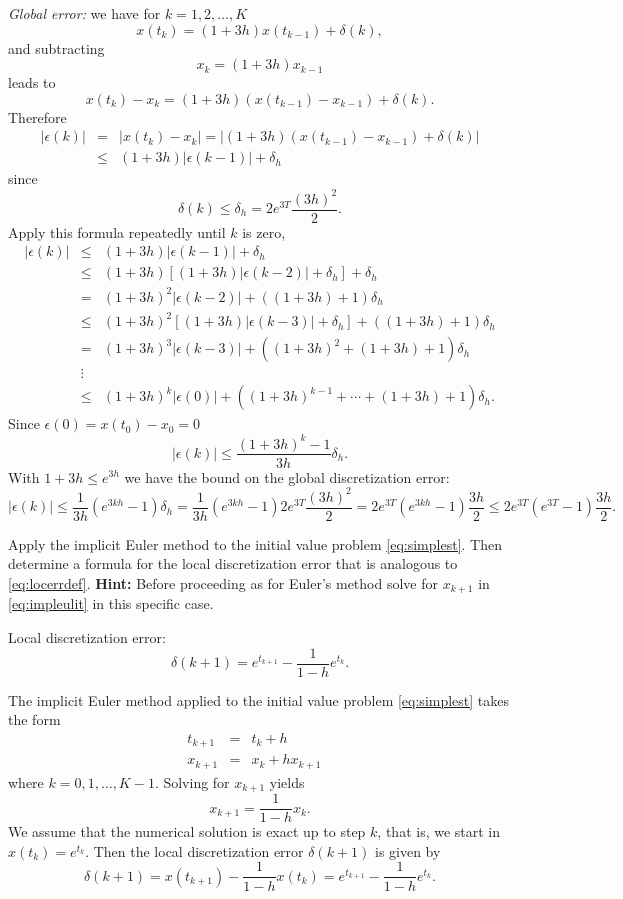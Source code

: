 \documentclass{ximera}
\begin{document}
\begin{exercise}
\begin{solution}
{\em Global error:} we have for $k=1,2,\ldots,K$
\[
x(t_k)=(1+3h)x(t_{k-1})+\delta(k),
\]
and subtracting
\[
x_k = (1+3h)x_{k-1}
\]
leads to
\[
x(t_k) - x_k = (1+3h)(x(t_{k-1})-x_{k-1})+\delta(k).
\]
Therefore
\begin{eqnarray*}
|\epsilon(k)| & = & |x(t_k) - x_k| =
|(1+3h)(x(t_{k-1})-x_{k-1})+\delta(k)|\\
& \le & (1+3h)|\epsilon(k-1)|+\delta_h
\end{eqnarray*}
since
\[
\delta(k)\le \delta_h = 2e^{3T}\frac{(3h)^2}{2}.
\]
Apply this formula repeatedly until $k$ is zero,
\[
\begin{array}{rcl}
|\epsilon(k)|&\le&(1+3h)|\epsilon(k-1)|+\delta_h\\
&\le& (1+3h)[(1+3h)|\epsilon(k-2)|+\delta_h]+\delta_h\\
&=& (1+3h)^2|\epsilon(k-2)| + ((1+3h) + 1)\delta_h\\
&\le& (1+3h)^2[(1+3h)|\epsilon(k-3)|+\delta_h] + ((1+3h) + 1)\delta_h\\
&=& (1+3h)^3|\epsilon(k-3)| + ((1+3h)^2 + (1+3h) + 1)\delta_h\\
&\vdots& \\
&\le & (1+3h)^k|\epsilon(0)| + ((1+3h)^{k-1} +\cdots + (1+3h) + 1)\delta_h.
\end{array}
\]
Since $\epsilon(0)=x(t_0) - x_0=0$
\[
|\epsilon(k)| \le \frac{(1+3h)^k -1}{3h}\delta_h.
\]
With $1+3h\le e^{3h}$ we have the bound on the global discretization error:
\[
|\epsilon(k)| \le \frac{1}{3h} (e^{3kh}-1)\delta_h=
\frac{1}{3h}(e^{3kh}-1)2e^{3T}\frac{(3h)^2}{2} =
2e^{3T}(e^{3kh}-1)\frac{3h}{2}
\le 2e^{3T}(e^{3T}-1)\frac{3h}{2}.
\]

\end{solution}
\end{exercise}

\begin{exercise} \label{c15.2.2}
Apply the implicit Euler method to the initial value problem
\eqref{eq:simplest}.  Then determine a formula for the local 
discretization error that is analogous to \eqref{eq:locerrdef}.
{\bf Hint:} Before proceeding as for Euler's method solve
for $x_{k+1}$ in \eqref{eq:impleulit} in this specific case.

\begin{solution}
\ans Local discretization error:
\[
\delta(k+1) = e^{t_{k+1}} - \frac{1}{1-h} e^{t_k}.
\]

\soln The implicit Euler method applied to the initial value problem
\eqref{eq:simplest} takes the form
\[
\begin{array}{rclc}
t_{k+1} & = & t_k+h & \\
x_{k+1} & = & x_k + h x_{k+1} &
\end{array}
\]
where $k=0,1,\ldots,K-1$.  Solving for $x_{k+1}$ yields
\[
x_{k+1} = \frac{1}{1-h}x_k.
\]
We assume that the numerical solution is exact up to step $k$, that is,
we start in $x(t_k)=e^{t_k}$.  Then the local discretization error
$\delta(k+1)$ is given by
\[
\delta(k+1) = x(t_{k+1}) - \frac{1}{1-h}x(t_k)=
e^{t_{k+1}} - \frac{1}{1-h}e^{t_k}.
\]

\end{solution}
\end{exercise}
\end{document}

